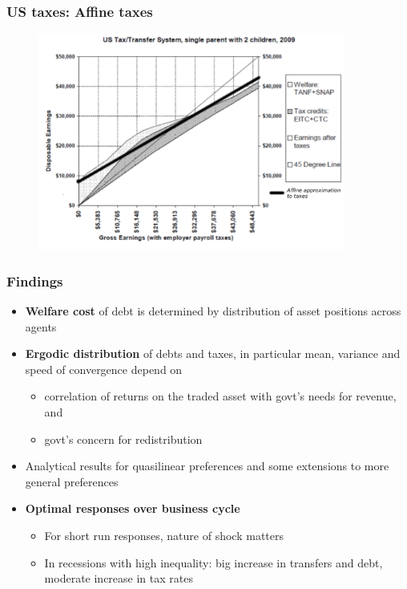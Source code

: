 \documentclass{beamer}
\begin{document}
\begin{frame}
\frametitle{US taxes: Affine taxes}
{
  \begin{figure}
    \centering
    \includegraphics[width = 0.9\textwidth]{affine_taxes.pdf}
  \end{figure}

}
\end{frame}
\begin{frame}%

\frametitle{Findings}

\begin{itemize}
\item \textbf{Welfare cost} of debt is determined by distribution of asset positions across agents
\item \textbf{Ergodic distribution} of debts and taxes, in particular mean, variance and speed of convergence depend on

\begin{itemize}
\item correlation of returns on the traded asset with govt's needs for revenue, and 
\item  govt's concern for redistribution
\end{itemize}
\item  Analytical results for quasilinear preferences and some extensions to more general preferences
\item \textbf{Optimal responses over business cycle}
\begin{itemize}
\item For short run responses, nature of shock matters
\item  In recessions with high inequality:
big increase in transfers and debt, moderate increase in tax rates
\end{itemize}
\end{itemize}

\end{frame}%
\end{document}
